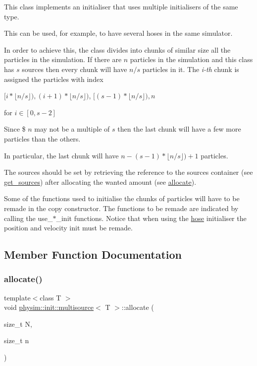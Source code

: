 This class implements an initialiser that uses multiple initialisers of the same type.

This can be used, for example, to have several hoses in the same simulator.

In order to achieve this, the class divides into chunks of similar size all the particles in the simulation. If there are $n$ particles in the simulation and this class has $s$ sources then every chunk will have $n/s$ particles in it. The {\itshape i-\/th} chunk is assigned the particles with index

$[i*\lfloor n/s \rfloor), (i + 1)*\lfloor n/s \rfloor)$, $[(s - 1)*\lfloor n/s \rfloor), n$

for $i \in [0,s - 2] $

Since \$ $n$ may not be a multiple of $s$ then the last chunk will have a few more particles than the others.

In particular, the last chunk will have $n - (s - 1)*\lfloor n/s \rfloor) + 1$ particles.

The sources should be set by retrieving the reference to the sources container (see \hyperlink{classphysim_1_1init_1_1multisource_a075bc9637cb8b843253fade495de87c3}{get\+\_\+sources}) after allocating the wanted amount (see \hyperlink{classphysim_1_1init_1_1multisource_af4a2f1d12712c4d672233539e721f000}{allocate}).

Some of the functions used to initialise the chunks of particles will have to be remade in the copy constructor. The functions to be remade are indicated by calling the use\+\_\+$\ast$\+\_\+init functions. Notice that when using the \hyperlink{classphysim_1_1init_1_1hose}{hose} initialiser the position and velocity init must be remade. 

\subsection{Member Function Documentation}
\mbox{\label{classphysim_1_1init_1_1multisource_af4a2f1d12712c4d672233539e721f000}} 
\subsubsection{\texorpdfstring{allocate()}{allocate()}}
{\footnotesize\ttfamily template$<$class T $>$ \\
void \hyperlink{classphysim_1_1init_1_1multisource}{physim\+::init\+::multisource}$<$ T $>$\+::allocate (\begin{DoxyParamCaption}\item[{size\+\_\+t}]{N,  }\item[{size\+\_\+t}]{n }\end{DoxyParamCaption})}



